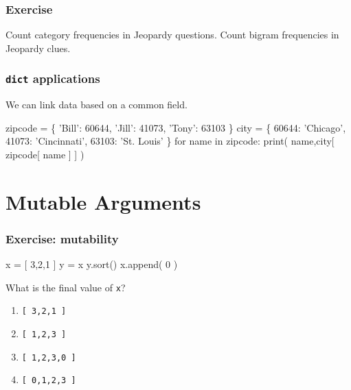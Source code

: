 \documentclass[11pt]{beamer}
\begin{document}
\begin{frame}[fragile]
  \frametitle{Exercise}
  \Enlarge

  \begin{itemize}
  \myitem  Count category frequencies in Jeopardy questions.
  \myitem  Count bigram frequencies in Jeopardy clues.
  \end{itemize}
\end{frame}

\begin{frame}[fragile]
  \frametitle{\texttt{dict} applications}
  \Enlarge

  \begin{itemize}
  \myitem  We can link data based on a common field.
  \end{itemize}
  \begin{semiverbatim}
zipcode = \{ 'Bill': 60644,
            'Jill': 41073,
            'Tony': 63103 \}
city = \{ 60644: 'Chicago',
         41073: 'Cincinnati',
         63103: 'St. Louis' \}
for name in zipcode:
    print( name,city[ zipcode[ name ] ] )
  \end{semiverbatim}
\end{frame}

\section{Mutable Arguments}

\begin{frame}[fragile]
  \frametitle{Exercise:  mutability}
  \Enlarge

  \begin{semiverbatim}
x = [ 3,2,1 ]
y = x
y.sort()
x.append( 0 )
  \end{semiverbatim}
  What is the final value of \texttt{x}?
  \begin{enumerate}[label=\Alph*]
  \item  \texttt{[ 3,2,1 ]}
  \item  \texttt{[ 1,2,3 ]}
  \item  \texttt{[ 1,2,3,0 ]} %
  \item  \texttt{[ 0,1,2,3 ]}
  \end{enumerate}
\end{frame}
\end{document}
